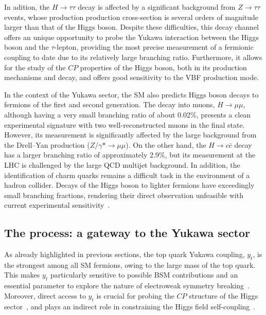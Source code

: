 In adition, the $H \rightarrow \tau\tau$ decay is affected by a significant background from $Z \rightarrow \tau\tau$ events, whose production production cross-section is several orders of magnitude larger than that of the Higgs boson. Despite these difficulties, this decay channel offers an unique opportunity to probe the Yukawa interaction between the Higgs boson and the $\tau$-lepton, providing the most precise measurement of a fermionic coupling to date due to its relatively large branching ratio. Furthermore, it allows for the study of the $CP$ properties of the Higgs boson, both in its production mechanisms and decay, and offers good sensitivity to the VBF production mode.

In the context of the Yukawa sector, the SM also predicts Higgs boson decays to fermions of the first and second generation. The decay into muons, \( H \rightarrow \mu\mu \), although having a very small branching ratio of about 0.02\%, presents a clean experimental signature with two well-reconstructed muons in the final state. However, its measurement is significantly affected by the large background from the Drell--Yan production ($Z/\gamma* \to \mu \mu$). On the other hand, the \( H \rightarrow c\bar{c} \) decay has a larger branching ratio of approximately 2.9\%, but its measurement at the LHC is challenged by the large QCD multijet background. In addition, the identification of charm quarks remains a difficult task in the environment of a hadron collider. Decays of the Higgs boson to lighter fermions have exceedingly small branching fractions, rendering their direct observation unfeasible with current experimental sensitivity~\cite{https://doi.org/10.23731/cyrm-2017-002}.

\subsection{The \ttH process: a gateway to the Yukawa sector}
\label{sec:ttH}
As already highlighted in previous sections, the top quark Yukawa coupling, $y_t$, is the strongest among all SM fermions, owing to the large mass of the top quark. This makes $y_t$ particularly sensitive to possible BSM contributions and an essential parameter to explore the nature of electroweak symmetry breaking~\cite{Englert:2014uua,Dobrescu:1997nm,Chivukula:1998wd,Delepine:1995qs}. Moreover, direct access to $y_t$ is crucial for probing the $CP$ structure of the Higgs sector~\cite{Bernreuther:2002uj,Brod:2013cka}, and plays an indirect role in constraining the Higgs field self-coupling~\cite{Buttazzo:2013uya,Degrassi:2016wml}.

